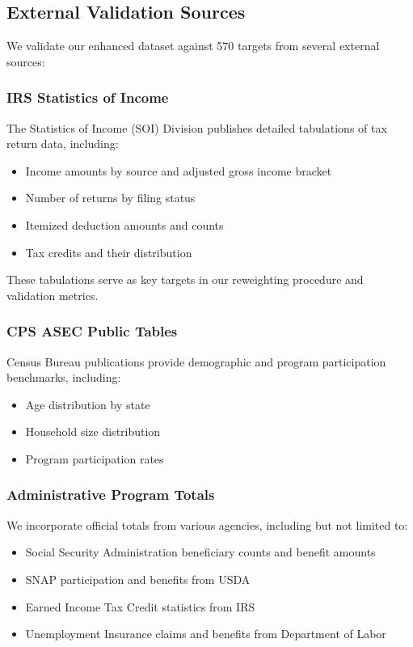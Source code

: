 \subsection{External Validation Sources}

We validate our enhanced dataset against 570 targets from several external sources:

\subsubsection{IRS Statistics of Income}

The Statistics of Income (SOI) Division publishes detailed tabulations of tax return data, including:
\begin{itemize}
    \item Income amounts by source and adjusted gross income bracket
    \item Number of returns by filing status
    \item Itemized deduction amounts and counts
    \item Tax credits and their distribution
\end{itemize}

These tabulations serve as key targets in our reweighting procedure and validation metrics.

\subsubsection{CPS ASEC Public Tables}

Census Bureau publications provide demographic and program participation benchmarks, including:
\begin{itemize}
    \item Age distribution by state
    \item Household size distribution
    \item Program participation rates
\end{itemize}

\subsubsection{Administrative Program Totals}

We incorporate official totals from various agencies, including but not limited to:
\begin{itemize}
    \item Social Security Administration beneficiary counts and benefit amounts
    \item SNAP participation and benefits from USDA
    \item Earned Income Tax Credit statistics from IRS
    \item Unemployment Insurance claims and benefits from Department of Labor
\end{itemize}

